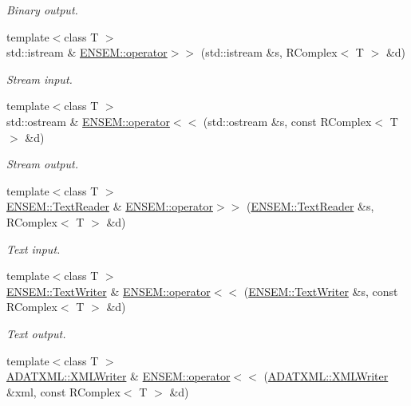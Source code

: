 \begin{DoxyCompactItemize}
\begin{DoxyCompactList}\small\item\em Binary output. \end{DoxyCompactList}\item 
{\footnotesize template$<$class T $>$ }\\std\+::istream \& \mbox{\hyperlink{group__rcomplex_ga8c6191376b048bab19190ecad0d19772}{E\+N\+S\+E\+M\+::operator$>$$>$}} (std\+::istream \&s, R\+Complex$<$ T $>$ \&d)
\begin{DoxyCompactList}\small\item\em Stream input. \end{DoxyCompactList}\item 
{\footnotesize template$<$class T $>$ }\\std\+::ostream \& \mbox{\hyperlink{group__rcomplex_ga3e9d2c0a2fe66eca65cad22143bae236}{E\+N\+S\+E\+M\+::operator$<$$<$}} (std\+::ostream \&s, const R\+Complex$<$ T $>$ \&d)
\begin{DoxyCompactList}\small\item\em Stream output. \end{DoxyCompactList}\item 
{\footnotesize template$<$class T $>$ }\\\mbox{\hyperlink{classENSEM_1_1TextReader}{E\+N\+S\+E\+M\+::\+Text\+Reader}} \& \mbox{\hyperlink{group__rcomplex_ga6dccaeb2f80acd5c96bc96d929a72852}{E\+N\+S\+E\+M\+::operator$>$$>$}} (\mbox{\hyperlink{classENSEM_1_1TextReader}{E\+N\+S\+E\+M\+::\+Text\+Reader}} \&s, R\+Complex$<$ T $>$ \&d)
\begin{DoxyCompactList}\small\item\em Text input. \end{DoxyCompactList}\item 
{\footnotesize template$<$class T $>$ }\\\mbox{\hyperlink{classENSEM_1_1TextWriter}{E\+N\+S\+E\+M\+::\+Text\+Writer}} \& \mbox{\hyperlink{group__rcomplex_gaddd3f3bfef7fda1dcb327c57c20891bb}{E\+N\+S\+E\+M\+::operator$<$$<$}} (\mbox{\hyperlink{classENSEM_1_1TextWriter}{E\+N\+S\+E\+M\+::\+Text\+Writer}} \&s, const R\+Complex$<$ T $>$ \&d)
\begin{DoxyCompactList}\small\item\em Text output. \end{DoxyCompactList}\item 
{\footnotesize template$<$class T $>$ }\\\mbox{\hyperlink{classADATXML_1_1XMLWriter}{A\+D\+A\+T\+X\+M\+L\+::\+X\+M\+L\+Writer}} \& \mbox{\hyperlink{group__rcomplex_gaa63187dcbe17285c7d04fd9887d97b6a}{E\+N\+S\+E\+M\+::operator$<$$<$}} (\mbox{\hyperlink{classADATXML_1_1XMLWriter}{A\+D\+A\+T\+X\+M\+L\+::\+X\+M\+L\+Writer}} \&xml, const R\+Complex$<$ T $>$ \&d)

\end{DoxyCompactItemize}
